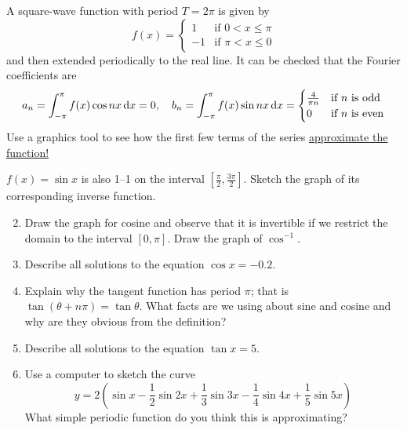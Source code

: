 \begin{example}{}{}
A square-wave function with period $T=2\pi$ is given by
\[f(x)=\begin{cases}
1&\text{if }0<x\le \pi\\
-1&\text{if }\pi<x\le 0
\end{cases}\]
and then extended periodically to the real line. It can be checked that the Fourier coefficients are
\[a_n=\int_{-\pi}^{\pi} f(x)\cos nx\,{\mathrm{d} x}=0,\quad b_n=\int_{-\pi}^{\pi} f(x)\sin nx\,{\mathrm{d} x}=\begin{cases}
\frac 4{\pi n}&\text{if $n$ is odd}\\
0&\text{if $n$ is even}
\end{cases}\]
Use a graphics tool to see how the first few terms of the series \href{https://www.math.uci.edu/~ndonalds/math121b/orth-fourier.html}{approximate the function!}
\end{example}


\begin{exercises}
\exstart $f(x)=\sin x$ is also 1--1 on the interval $[\frac\pi 2,\frac{3\pi}2]$. Sketch the graph of its corresponding inverse function.
\begin{enumerate}\setcounter{enumi}{1}
  \item Draw the graph for cosine and observe that it is invertible if we restrict the domain to the interval $[0,\pi]$. Draw the graph of $\cos^{-1}$.
  \item Describe all solutions to the equation $\cos x=-0.2$.
  \item Explain why the tangent function has period $\pi$; that is $\tan(\theta+n\pi)=\tan \theta$. What facts are we using about sine and cosine and why are they obvious from the definition?
  \item Describe all solutions to the equation $\tan x=5$.
  
  \item Use a computer to sketch the curve
  \[y=2\left(\sin x-\frac 12\sin 2x+\frac 13\sin 3x-\frac 14\sin 4x+\frac 15\sin 5x\right)\]
  What simple periodic function do you think this is approximating?
\end{enumerate}
\end{exercises}

\clearpage

